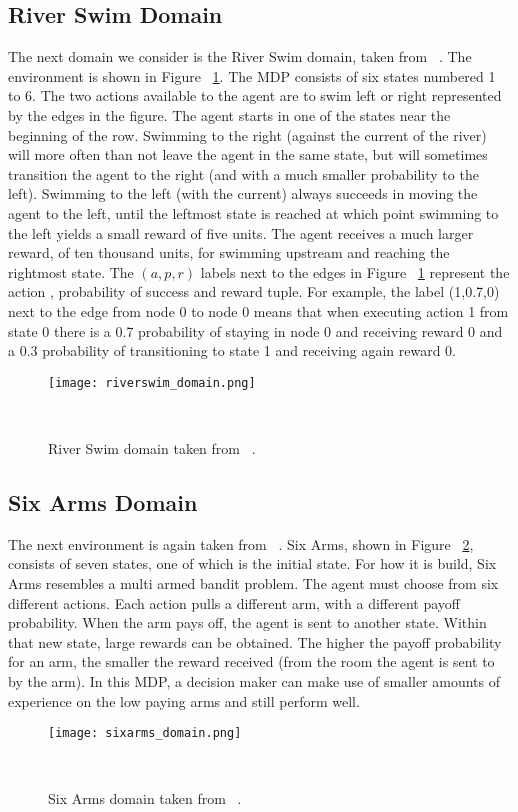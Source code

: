 \subsection{River Swim Domain }
The next domain we consider is the River Swim domain, taken from ~\cite{Strehl2008AnAO}. The environment is shown in Figure ~\ref{fig:riverswim_domain}. The MDP consists of six states numbered 1 to 6. The two actions available to the agent are to swim left or right represented by the edges in the figure. The agent starts in one of the states near the beginning of the row. Swimming to the right (against the current of the river) will more often than not leave the agent in the same state, but will sometimes transition the agent to the right (and with a much smaller probability to the left). Swimming to the left (with the current) always succeeds in moving the agent to the left, until the leftmost state is reached at which point swimming to the left yields a small reward of five units. The agent receives a much larger reward, of ten thousand units, for swimming upstream and reaching the rightmost state. The $(a,p,r)$ labels next to the edges in Figure ~\ref{fig:riverswim_domain} represent the action , probability of success and reward tuple. For example, the label (1,0.7,0) next to the edge from node 0 to node 0 means that when executing action 1 from state 0 there is a 0.7 probability of staying in node 0 and receiving reward 0 and a 0.3 probability of transitioning to state 1 and receiving again reward 0.
\begin{figure}
 \texttt{[image: riverswim\_domain.png]}
 \caption{River Swim domain taken from ~\cite{Strehl2008AnAO}.} ~
 \label{fig:riverswim_domain}
\end{figure}
\subsection{Six Arms Domain}
The next environment is again taken from ~\cite{Strehl2008AnAO}. Six Arms, shown in Figure ~\ref{fig:sixarms_domain}, consists of seven states, one of which is the initial state. For how it is build, Six Arms resembles a multi armed bandit problem. The agent must choose from six different actions. Each action pulls a different arm, with a different payoff probability. When the arm pays off, the agent is sent to another state. Within that new state, large rewards can be obtained. The higher the payoff probability for an arm, the smaller the reward received (from the room the agent is sent to by the arm). In this MDP, a decision maker can make use of smaller amounts of experience on the low paying arms and still perform well.
\begin{figure}
 \texttt{[image: sixarms\_domain.png]}
 \caption{Six Arms domain taken from ~\cite{Strehl2008AnAO}.} ~
\label{fig:sixarms_domain}
\end{figure}
